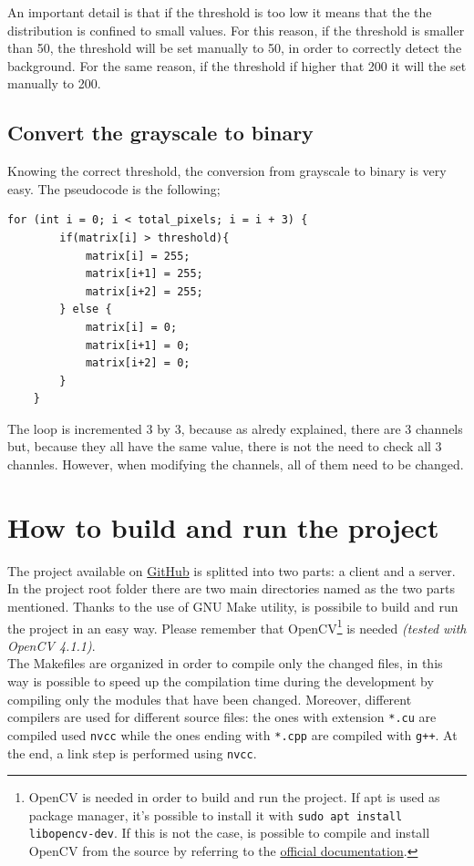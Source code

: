 \documentclass[paper=a4, fontsize=10pt]{scrartcl}	%
\begin{document}
	An important detail is that if the threshold is too low it means that the the distribution is confined to small values. For this reason, if the threshold is smaller than 50, the threshold will be set manually to 50, in order to correctly detect the background. For the same reason, if the threshold if higher that 200 it will the set manually to 200.


	\subsection{Convert the grayscale to binary}

	Knowing the correct threshold, the conversion from grayscale to binary is very easy. The pseudocode is the following;

	\begin{lstlisting}[style=CStyle]
	for (int i = 0; i < total_pixels; i = i + 3) {
		if(matrix[i] > threshold){
			matrix[i] = 255;
			matrix[i+1] = 255;
			matrix[i+2] = 255;
		} else {
			matrix[i] = 0;
			matrix[i+1] = 0;
			matrix[i+2] = 0;
		}
	}
	\end{lstlisting}

	The loop is incremented 3 by 3, because as alredy explained, there are 3 channels but, because they all have the same value, there is not the need to check all 3 channles. However, when modifying the channels, all of them need to be changed. 
	

	\newpage
	\section{How to build and run the project}

	The project available on \href{https://github.com/MatteoBattilana/CUDAVideoStream}{GitHub} is splitted into two parts: a client and a server. In the project root folder there are two main directories named as the two parts mentioned. Thanks to the use of GNU Make utility, is possibile to build and run the project in an easy way. Please remember that OpenCV\footnote{OpenCV is needed in order to build and run the project. If apt is used as package manager, it's possible to install it with \texttt{sudo apt install libopencv-dev}. If this is not the case, is possible to compile and install OpenCV from the source by referring to the \href{https://docs.opencv.org/4.x/d7/d9f/tutorial\_linux\_install.html}{official documentation}.} is needed \textit{(tested with OpenCV 4.1.1)}.\\
	
	The Makefiles are organized in order to compile only the changed files, in this way is possible to speed up the compilation time during the development by compiling only the modules that have been changed. Moreover, different compilers are used for different source files: the ones with extension \texttt{*.cu} are compiled used \texttt{nvcc} while the ones ending with \texttt{*.cpp} are compiled with \texttt{g++}. At the end, a link step is performed using \texttt{nvcc}.\\
	
\end{document}
